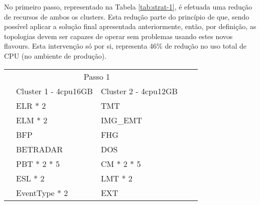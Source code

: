 No primeiro passo, representado na Tabela \ref{tab:strat-1}, é efetuada uma redução de recursos 
de ambos os \glspl{cluster}. Esta redução parte do princípio de que, sendo possível aplicar a 
solução final apresentada anteriormente, então, por definição, as topologias devem ser capazes de
operar sem problemas usando estes novos \glspl{flavour}. Esta intervenção só por si, representa
46\% de redução no uso total de \ac{CPU} (no ambiente de produção).

\begin{table}[H]
  \centering
  \small 
  \setlength{\extrarowheight}{3pt}
  \setlength{\arrayrulewidth}{1pt} 
  
  \begin{tabular}{|l|l|l|l|l|}
    \hline
    \cellcolor{white} & \multicolumn{2}{|c|}{\cellcolor[HTML]{FBE6A3}Passo 1} & \cellcolor{white}              & \cellcolor{white}               \\ \cline{1-4} 
    & \cellcolor[HTML]{4EAC5B}Cluster 1 - 4cpu16GB          & \cellcolor[HTML]{4EAC5B}Cluster 2 - 4cpu12GB          &               &               \\ \cline{1-4} 
    & \cellcolor[HTML]{A9D08E}ELR * 2                       & \cellcolor[HTML]{BDD7EE}TMT                           &               &               \\ \cline{1-4} 
    & \cellcolor[HTML]{A9D08E}ELM * 2                       & \cellcolor[HTML]{BDD7EE}IMG\_EMT                      &               &               \\ \cline{1-4} 
    & \cellcolor[HTML]{A9D08E}BFP                           & \cellcolor[HTML]{BDD7EE}FHG                           &               &               \\ \cline{1-4} 
    & \cellcolor[HTML]{A9D08E}BETRADAR                      & \cellcolor[HTML]{BDD7EE}DOS                           &               &               \\ \cline{1-4} 
    & \cellcolor[HTML]{A9D08E}PBT * 2 * 5                   & \cellcolor[HTML]{BDD7EE}CM * 2 * 5                    &               &               \\ \cline{1-4} 
    & \cellcolor[HTML]{A9D08E}ESL * 2                       & \cellcolor[HTML]{BDD7EE}LMT * 2                       &               &               \\ \cline{1-4} 
    & \cellcolor[HTML]{A9D08E}EventType * 2                 & \cellcolor[HTML]{BDD7EE}EXT                           &               &               \\ \cline{1-4} 

\end{tabular}
\end{table}
